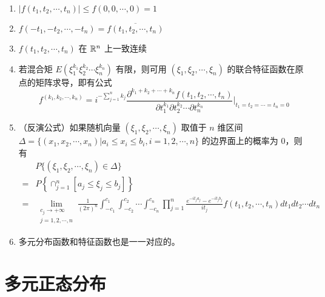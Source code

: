 \documentclass[12pt,a4paper]{amsart}
\begin{document}
\begin{proposition}[多元特征函数的性质]
    \begin{enumerate}
        \item $|f(t_1, t_2, \cdots, t_n)| \leq f(0, 0, \cdots, 0) = 1$
        \item $f(-t_1, -t_2, \cdots, -t_n) = \overline{f(t_1, t_2, \cdots, t_n)}$
        \item $f(t_1, t_2, \cdots, t_n)$ 在 $\mathbb{R}^n$ 上一致连续
        \item 若混合矩 $E(\xi_1^{k_1}\xi_2^{k_2}\cdots\xi_n^{k_n})$ 有限，则可用 $(\xi_1, \xi_2, \cdots, \xi_n)$ 的联合特征函数在原点的矩阵求导，即有公式
        \begin{equation}
            f^{(k_1, k_2, \cdots, k_n)} = i^{-\sum_{j=1}^{n} k_j} \frac{\partial^{k_1+k_2+\cdots+k_n} f(t_1, t_2, \cdots, t_n)}{\partial t_1^{k_1} \partial t_2^{k_2} \cdots \partial t_n^{k_n}} \Bigg|_{t_1=t_2=\cdots=t_n=0}
        \end{equation}
        \item （反演公式）如果随机向量 $(\xi_1, \xi_2, \cdots, \xi_n)$ 取值于 $n$ 维区间 $\Delta = \{(x_1, x_2, \cdots, x_n) | a_i \leq x_i \leq b_i, i=1, 2, \cdots, n\}$ 的边界面上的概率为 0，则有
        \begin{equation}
            \begin{aligned}
                &P\{(\xi_1, \xi_2, \cdots, \xi_n)\in\Delta\} \\
                =&P\left\{\cap_{j=1}^{n} [a_j \leq \xi_j \leq b_j] \right\} \\
                =&\lim\limits_{\substack{c_j\to+\infty \\ j = 1,2,\cdots,n}} \frac{1}{(2\pi)^n} \int_{-c_1}^{c_1} \int_{-c_2}^{c_2} \cdots \int_{-c_n}^{c_n} \prod_{j=1}^{n} \frac{e^{-it_ja_j}-e^{-it_jb_j}}{it_j} f(t_1, t_2, \cdots, t_n) dt_1 dt_2 \cdots dt_n
            \end{aligned}
        \end{equation}
        \item 多元分布函数和特征函数也是一一对应的。
    \end{enumerate}
\end{proposition}

\section{多元正态分布}

\appendix


{\footnotesize}
\end{document}
